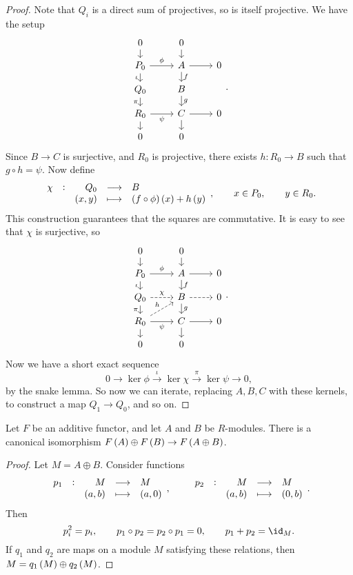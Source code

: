 \begin{proof}
Note that $ Q_i $ is a direct sum of projectives, so is itself projective. We have the setup
$$
\begin{tikzcd}[row sep=small]
0 \arrow{d} & 0 \arrow{d} & \\
P_0 \arrow{r}{\phi} \arrow{d}[swap]{\iota} & A \arrow{r} \arrow{d}{f} & 0 \\
Q_0 \arrow{d}[swap]{\pi} & B \arrow{d}{g} & \\
R_0 \arrow{r}[swap]{\psi} \arrow{d} & C \arrow{r} \arrow{d} & 0 \\
0 & 0 &
\end{tikzcd}.
$$
Since $ B \to C $ is surjective, and $ R_0 $ is projective, there exists $ h : R_0 \to B $ such that $ g \circ h = \psi $. Now define
$$ \function[\chi]{Q_0}{B}{\br{x, y}}{\br{f \circ \phi}\br{x} + h\br{y}}, \qquad x \in P_0, \qquad y \in R_0. $$
This construction guarantees that the squares are commutative. It is easy to see that $ \chi $ is surjective, so
$$
\begin{tikzcd}[row sep=small]
0 \arrow{d} & 0 \arrow{d} & \\
P_0 \arrow{r}{\phi} \arrow{d}[swap]{\iota} & A \arrow{r} \arrow{d}{f} & 0 \\
Q_0 \arrow[dashed]{r}{\chi} \arrow{d}[swap]{\pi} & B \arrow[dashed]{r} \arrow{d}{g} & 0 \\
R_0 \arrow[dashed]{ur}{h} \arrow{r}[swap]{\psi} \arrow{d} & C \arrow{r} \arrow{d} & 0 \\
0 & 0 &
\end{tikzcd}.
$$
Now we have a short exact sequence
$$ 0 \to \ker \phi \xrightarrow{\iota} \ker \chi \xrightarrow{\pi} \ker \psi \to 0, $$
by the snake lemma. So now we can iterate, replacing $ A, B, C $ with these kernels, to construct a map $ Q_1 \to Q_0 $, and so on.
\end{proof}

\begin{proposition}
Let $ F $ be an additive functor, and let $ A $ and $ B $ be $ R $-modules. There is a canonical isomorphism $ F\br{A} \oplus F\br{B} \to F\br{A \oplus B} $.
\end{proposition}

\begin{proof}
Let $ M = A \oplus B $. Consider functions
$$ \function[p_1]{M}{M}{\br{a, b}}{\br{a, 0}}, \qquad \function[p_2]{M}{M}{\br{a, b}}{\br{0, b}}. $$
Then
$$ p_i^2 = p_i, \qquad p_1 \circ p_2 = p_2 \circ p_1 = 0, \qquad p_1 + p_2 = \id_M. $$
If $ q_1 $ and $ q_2 $ are maps on a module $ M $ satisfying these relations, then $ M = q_1\br{M} \oplus q_2\br{M} $.
\end{proof}

